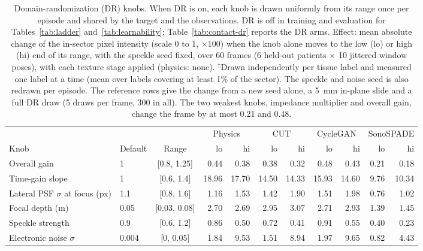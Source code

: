 
\begin{table}[tp]
\caption{Domain-randomization (DR) knobs. When DR is on, each knob is drawn uniformly from its range once per episode and shared by the target and the observations. DR is off in training and evaluation for Tables~\ref{tab:ladder} and~\ref{tab:learnability}; Table~\ref{tab:contact-dr} reports the DR arms. Effect: mean absolute change of the in-sector pixel intensity (scale 0 to 1, $\times 100$) when the knob alone moves to the low (lo) or high (hi) end of its range, with the speckle seed fixed, over 60 frames (6 held-out patients $\times$ 10 jittered window poses), with each texture stage applied (physics: none). $^{\dagger}$Drawn independently per tissue label and measured one label at a time (mean over labels covering at least 1\% of the sector). The speckle and noise seed is also redrawn per episode. The reference rows give the change from a new seed alone, a 5~mm in-plane slide and a full DR draw (5 draws per frame, 300 in all). The two weakest knobs, impedance multiplier and overall gain, change the frame by at most 0.21 and 0.48.}
\label{tab:dr}
\centering
\renewcommand{\baselinestretch}{1}\small
\setlength{\tabcolsep}{4pt}
\begin{tabular}{@{}llc@{\hspace{12pt}}rr@{\hspace{12pt}}rr@{\hspace{12pt}}rr@{\hspace{12pt}}rr@{}}
\toprule
 & & & \multicolumn{2}{c}{Physics} & \multicolumn{2}{c}{CUT} & \multicolumn{2}{c}{CycleGAN} & \multicolumn{2}{c}{SonoSPADE} \\
\cmidrule(lr){4-5} \cmidrule(lr){6-7} \cmidrule(lr){8-9} \cmidrule(lr){10-11}
Knob & Default & Range & lo & hi & lo & hi & lo & hi & lo & hi \\
\midrule
Overall gain & 1 & [0.8, 1.25] & 0.44 & 0.38 & 0.38 & 0.32 & 0.48 & 0.43 & 0.21 & 0.18 \\
Time-gain slope & 1 & [0.6, 1.4] & 18.96 & 17.70 & 14.50 & 14.33 & 15.93 & 14.60 & 9.76 & 10.34 \\
Lateral PSF $\sigma$ at focus (px) & 1.1 & [0.8, 1.6] & 1.16 & 1.53 & 1.42 & 1.90 & 1.51 & 1.98 & 0.76 & 1.02 \\
Focal depth (m) & 0.05 & [0.03, 0.08] & 2.70 & 2.69 & 2.95 & 3.07 & 2.71 & 2.93 & 1.39 & 1.45 \\
Speckle strength & 0.9 & [0.6, 1.2] & 0.86 & 0.50 & 0.72 & 0.41 & 0.91 & 0.55 & 0.40 & 0.23 \\
Electronic noise $\sigma$ & 0.004 & [0, 0.05] & 1.84 & 9.53 & 1.51 & 8.94 & 1.97 & 9.65 & 0.82 & 4.43 \\

\end{tabular}
\end{table}
